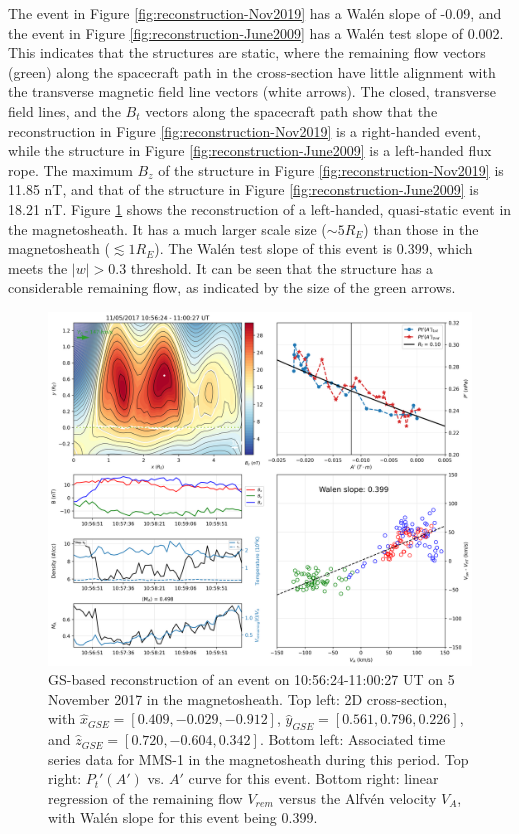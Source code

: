 The event in Figure \ref{fig:reconstruction-Nov2019} has a Wal\'en slope of -0.09, and the event in Figure \ref{fig:reconstruction-June2009} has a Wal\'en test slope of 0.002. This indicates that the structures are static, where the remaining flow vectors (green) along the spacecraft path in the cross-section have little alignment with the transverse magnetic field line vectors (white arrows). The closed, transverse field lines, and the $B_t$ vectors along the spacecraft path show that the reconstruction in Figure \ref{fig:reconstruction-Nov2019} is a right-handed event, while the structure in Figure \ref{fig:reconstruction-June2009} is a left-handed flux rope. The maximum $B_z$ of the structure in Figure \ref{fig:reconstruction-Nov2019} is 11.85 nT, and that of the structure in Figure \ref{fig:reconstruction-June2009} is 18.21 nT. Figure \ref{fig:reconstruction-Nov2017-quasistatic} shows the reconstruction of a left-handed, quasi-static event in the magnetosheath. It has a much larger scale size ($\sim5 R_E$) than those in the magnetosheath ($\lesssim1 R_E$). The Wal\'en test slope of this event is 0.399, which meets the $|w| > 0.3$ threshold. It can be seen that the structure has a considerable remaining flow, as indicated by the size of the green arrows.
\begin{figure}
    \centering
    \includegraphics[width=\textwidth]{Figures/Reconstructions/timeseries_walenTest_20171105_20171106.png}
    \caption[GS-based event reconstruction for 15 November 2017]{GS-based reconstruction of an event on 10:56:24-11:00:27 UT on 5 November 2017 in the magnetosheath. Top left: 2D cross-section, with $\hat{x}_{GSE}=[0.409, -0.029, -0.912]$, $\hat{y}_{GSE}=[0.561, 0.796, 0.226]$, and $\hat{z}_{GSE}=[0.720, -0.604, 0.342]$. Bottom left: Associated time series data for MMS-1 in the magnetosheath during this period. Top right: $P_t'(A')$ vs. $A'$ curve for this event. Bottom right: linear regression of the remaining flow $V_{rem}$ versus the Alfv\'en velocity $V_A$, with Wal\'en slope for this event being 0.399.} %
    \label{fig:reconstruction-Nov2017-quasistatic}
\end{figure}

